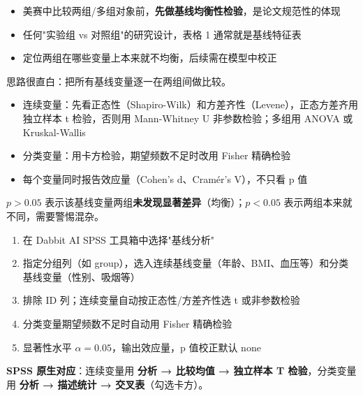 \begin{algoscene}
\begin{itemize}
    \item 美赛中比较两组/多组对象前，\textbf{先做基线均衡性检验}，是论文规范性的体现
    \item 任何"实验组 vs 对照组"的研究设计，表格 1 通常就是基线特征表
    \item 定位两组在哪些变量上本来就不均衡，后续需在模型中校正
\end{itemize}
\end{algoscene}

\begin{algoprinciple}
思路很直白：把所有基线变量逐一在两组间做比较。

\begin{itemize}
    \item 连续变量：先看正态性（Shapiro-Wilk）和方差齐性（Levene），正态方差齐用独立样本 t 检验，否则用 Mann-Whitney U 非参数检验；多组用 ANOVA 或 Kruskal-Wallis
    \item 分类变量：用卡方检验，期望频数不足时改用 Fisher 精确检验
    \item 每个变量同时报告效应量（Cohen's d、Cramér's V），不只看 p 值
\end{itemize}

$p>0.05$ 表示该基线变量两组\textbf{未发现显著差异}（均衡）；$p<0.05$ 表示两组本来就不同，需要警惕混杂。
\end{algoprinciple}

\begin{algosposs}
\begin{enumerate}
    \item 在 Dabbit AI SPSS 工具箱中选择"基线分析"
    \item 指定分组列（如 group），选入连续基线变量（年龄、BMI、血压等）和分类基线变量（性别、吸烟等）
    \item 排除 ID 列；连续变量自动按正态性/方差齐性选 t 或非参数检验
    \item 分类变量期望频数不足时自动用 Fisher 精确检验
    \item 显著性水平 $\alpha=0.05$，输出效应量，p 值校正默认 none
\end{enumerate}

\textbf{SPSS 原生对应}：连续变量用 \textbf{分析 → 比较均值 → 独立样本 T 检验}，分类变量用 \textbf{分析 → 描述统计 → 交叉表}（勾选卡方）。
\end{algosposs}

